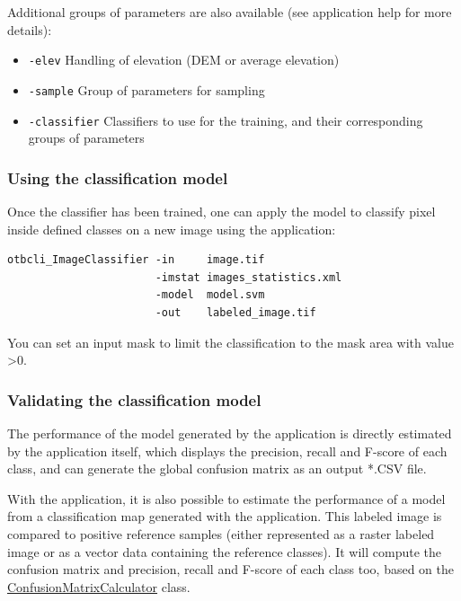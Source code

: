 Additional groups of parameters are also available (see application help for
more details):
\begin{itemize}
\item \verb?-elev? Handling of elevation (DEM or average elevation)
\item \verb?-sample? Group of parameters for sampling
\item \verb?-classifier? Classifiers to use for the training, and their corresponding groups of parameters
\end{itemize}


\subsubsection{Using the classification model}
Once the classifier has been trained, one can apply the model to classify
pixel inside defined classes on a new image using the
 application:

\begin{verbatim}
otbcli_ImageClassifier -in     image.tif
                       -imstat images_statistics.xml
                       -model  model.svm
                       -out    labeled_image.tif
\end{verbatim}

You can set an input mask to limit the classification to the mask area with
value \textgreater 0.


\subsubsection{Validating the classification model}
The performance of the model generated by the  
application is directly estimated by the application itself, which displays the 
precision, recall and F-score of each class, and can generate the global confusion 
matrix as an output *.CSV file.
 
With the  application, it is also possible to 
estimate the performance of a model from a classification map generated with the 
 application. 
This labeled image is compared to positive reference samples (either represented as 
a raster labeled image or as a vector data containing the reference classes). It 
will compute the confusion matrix and precision, recall and F-score of each class 
too, based on the 
\href{http://www.orfeo-toolbox.org/doxygen-current/classotb_1_1ConfusionMatrixCalculator.html}{ConfusionMatrixCalculator} 
class.

